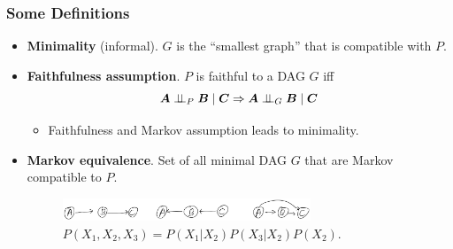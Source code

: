 \documentclass[10pt,xcolor={usenames,dvipsnames,table}]{beamer}
\begin{document}
\begin{frame}
\frametitle{Some Definitions}
\begin{itemize}
    \item \textbf{Minimality} (informal). $G$ is the ``smallest graph'' that is compatible with $P$.
\item \textbf{Faithfulness assumption}. $P$ is faithful to  a DAG $G$ iff
     \[
        \bm{A} \perp \!\!\! \perp_{P} \bm{B} \mid \bm{C} \Rightarrow \bm{A} \perp \!\!\! \perp_{G} \bm{B} \mid \bm{C} 
    \] 
    \begin{itemize}
        \item Faithfulness and Markov assumption leads to minimality.
    \end{itemize}
    \item \textbf{Markov equivalence}. Set of all minimal DAG $G$ that are Markov compatible to $P$.
\begin{figure}
    \centering
    \includegraphics[width=0.7\textwidth]{figures/equivalence_class.jpg}
    \caption*{$P(X_1, X_2, X_3) = P(X_1|X_2) P(X_3|X_2) P(X_2)$. }
\end{figure}
\end{itemize}
\end{frame}
\end{document}
